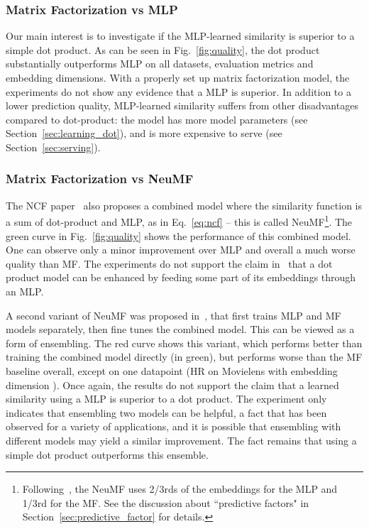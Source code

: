 \documentclass{article}
\begin{document}
\subsubsection{Matrix Factorization vs MLP}
Our main interest is to investigate if the MLP-learned similarity is superior to a simple dot product.
As can be seen in Fig.~\ref{fig:quality}, the dot product substantially outperforms MLP on all datasets, evaluation metrics and embedding dimensions.
With a properly set up matrix factorization model, the experiments do not show any evidence that a MLP is superior.
In addition to a lower prediction quality, MLP-learned similarity suffers from other disadvantages compared to dot-product: the model has more model parameters (see Section~\ref{sec:learning_dot}), and is more expensive to serve (see Section~\ref{sec:serving}).

\subsubsection{Matrix Factorization vs NeuMF}

The NCF paper~\cite{he:www17} also proposes a combined model where the similarity function is a sum of dot-product and MLP, as in Eq.~\eqref{eq:ncf} -- this is called NeuMF\footnote{Following~\cite{he:www17}, the NeuMF uses 2/3rds of the embeddings for the MLP and 1/3rd for the MF. See the discussion about ``predictive factors" in Section~\ref{sec:predictive_factor} for details.}.
The green curve in Fig.~\ref{fig:quality} shows the performance of this combined model.
One can observe only a minor improvement over MLP and overall a much worse quality than MF.
The experiments do not support the claim in~\cite{he:www17} that a dot product model can be enhanced by feeding some part of its embeddings through an MLP.

A second variant of NeuMF was proposed in~\cite{he:www17}, that first trains MLP and MF models separately, then fine tunes the combined model. This can be viewed as a form of ensembling.
The red curve shows this variant, which performs better than training the combined model directly (in green), but performs worse than the MF baseline overall, except on one datapoint (HR on Movielens with embedding dimension ).
Once again, the results do not support the claim that a learned similarity using a MLP is superior to a dot product. The experiment only indicates that ensembling two models can be helpful, a fact that has been observed for a variety of applications, and it is possible that ensembling with different models may yield a similar improvement. The fact remains that using a simple dot product outperforms this ensemble.
\end{document}
